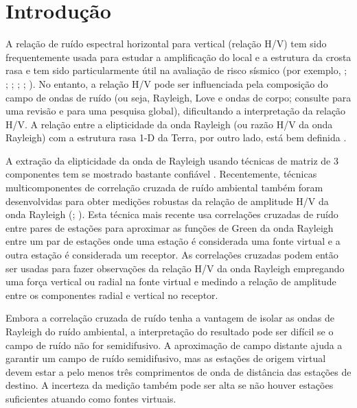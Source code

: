 \documentclass[smallextended]{svjour3}       %
\begin{document}

\newpage

\section{Introdução}

A relação de ruído espectral horizontal para vertical (relação H/V) \citep{nakamura1989method} tem sido frequentemente usada para estudar a amplificação do local e a estrutura da crosta rasa e tem sido particularmente útil na avaliação de risco sísmico (por exemplo, \citealp{field1993theoretical}; \citealp{bonilla1997site}; \citealp{konno1998ground}; \citealp{riepl1998detailed}; \citealp{parolai2002new}; \citealp{bonnefoy2006nature}). No entanto, a relação H/V pode ser influenciada pela composição do campo de ondas de ruído (ou seja, Rayleigh, Love e ondas de corpo; consulte \citealp{bonnefoy2006nature} para uma revisão e \citealp{koper2010composition} para uma pesquisa global), dificultando a interpretação da relação H/V. A relação entre a elipticidade da onda Rayleigh (ou razão H/V da onda Rayleigh) com a estrutura rasa 1-D da Terra, por outro lado, está bem definida \citep{tanimoto2008zh}. 

A extração da elipticidade da onda de Rayleigh usando técnicas de matriz de 3 componentes tem se mostrado bastante confiável \citep{poggi2010estimating}. Recentemente, técnicas multicomponentes de correlação cruzada de ruído ambiental também foram desenvolvidas para obter medições robustas da relação de amplitude H/V da onda Rayleigh (\citealp{lin2014upper}; \citealp{lin20143}). Esta técnica mais recente usa correlações cruzadas de ruído entre pares de estações para aproximar as funções de Green da onda Rayleigh entre um par de estações onde uma estação é considerada uma fonte virtual e a outra estação é considerada um receptor. As correlações cruzadas podem então ser usadas para fazer observações da relação H/V da onda Rayleigh empregando uma força vertical ou radial na fonte virtual e medindo a relação de amplitude entre os componentes radial e vertical no receptor.

Embora a correlação cruzada de ruído tenha a vantagem de isolar as ondas de Rayleigh do ruído ambiental, a interpretação do resultado pode ser difícil se o campo de ruído não for semidifusivo. 
A aproximação de campo distante ajuda a garantir um campo de ruído semidifusivo, mas as estações de origem virtual devem estar a pelo menos três comprimentos de onda de distância das estações de destino. A incerteza da medição também pode ser alta se não houver estações suficientes atuando como fontes virtuais.
\end{document}
